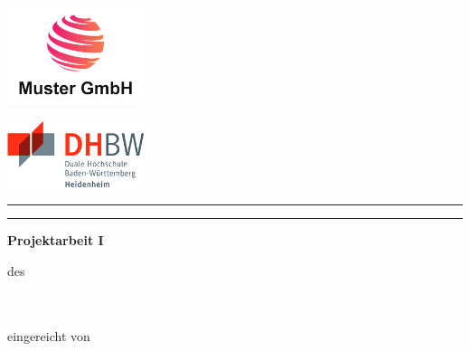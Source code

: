 \begin{titlepage}
    \noindent
    \begin{minipage}{0.45\textwidth}
        \includegraphics[width=4cm]{deckblatt/logos/company_logo.png}
    \end{minipage}
    \hfill
    \begin{minipage}{0.45\textwidth}
        \raggedleft
        \includegraphics[width=4cm]{deckblatt/logos/dhbw_logo.png}
    \end{minipage}

    \centering
    \vspace*{1.5cm}

    \begin{center}
    \rule{\textwidth}{0.6pt}
    \end{center}

    {\large\bfseries \projecttitle \par}

    \begin{center}
    \rule{\textwidth}{0.6pt}
    \end{center}

    {\large\bfseries Projektarbeit I\par}

    \vspace{0.5cm}
    {\normalsize des \degreeprogram\\
    \faculty\\
    \university\\
    \universitycity\par}
    
    \vspace{0.5cm}
    {\normalsize eingereicht von\\[0.1cm]
    \textbf{\studentname} \\
    \textbf{\studentaddress} \\
    \textbf{\studentcity} \\
    }


\end{titlepage}
